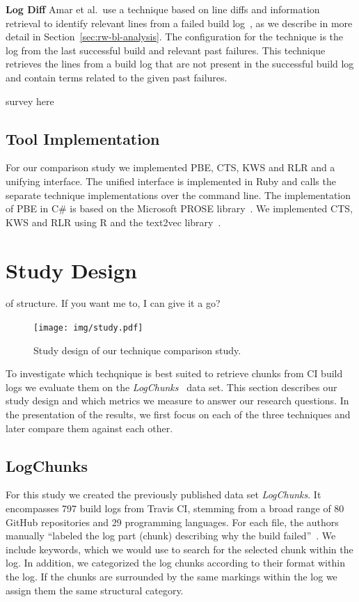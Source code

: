 \noindent
\textbf{Log Diff}
Amar et al.\ use a technique based on line diffs and information
retrieval to identify relevant lines from a failed build
log~\cite{amar2019mining}, as we describe in more detail in
Section~\ref{sec:rw-bl-analysis}.
The configuration for the technique
is the log from the last successful build and relevant past failures.
This technique retrieves the lines from a build log that are not
present in the successful build log and contain terms related to the
given past failures.

survey here

\subsection{Tool Implementation}
For our comparison study we implemented PBE, CTS, KWS and RLR and a
unifying interface.
The unified interface is implemented in Ruby and
calls the separate technique implementations over the command line.
The implementation of PBE in C\# is based on the Microsoft PROSE
library~\cite{prose2019webpage}.
We implemented CTS, KWS and RLR using
R and the text2vec library~\cite{text2vec2019webpage}.


\section{Study Design}
\label{sec:study}

of structure.
If you want me to, I can give it a go?
\begin{figure}[tb]
	\centering
	\texttt{[image: img/study.pdf]}
	\caption{Study design of our technique comparison study.}
	\label{fig:study}
\end{figure}

To investigate which techqnique is best suited to retrieve chunks from
CI build logs we evaluate them on the
\emph{LogChunks}~\cite{brandt2020logchunks} data set.
This section
describes our study design and which metrics we measure to answer our
research questions.
In the presentation of the results, we first focus
on each of the three techniques and later compare them against each
other.

\subsection{LogChunks}
For this study we created the previously published data set
\emph{LogChunks}.
It encompasses 797 build logs from Travis CI,
stemming from a broad range of 80 GitHub repositories and 29
programming languages.
For each file, the authors manually ``labeled
the log part (chunk) describing why the build
failed''~\cite{brandt2020logchunks}.
We include keywords, which we
would use to search for the selected chunk within the log.
In
addition, we categorized the log chunks according to their format
within the log.
If the chunks are surrounded by the same markings
within the log we assign them the same structural category.

